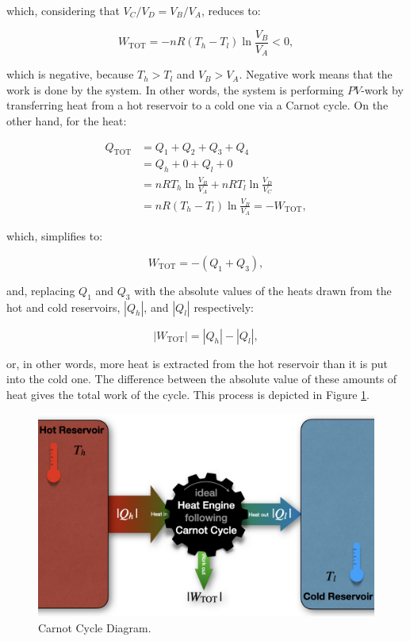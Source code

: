\documentclass[
  9pt,
]{extbook}
\theoremstyle{definition}
\theoremstyle{definition}
\theoremstyle{definition}
\theoremstyle{remark}
\begin{document}
which, considering that \(V_C/V_D=V_B/V_A\), reduces to:

\begin{equation}
  W_{\text{TOT}} = - nR \left( T_h-T_l \right) \ln \frac{V_B}{V_A} < 0,
  \label{eq:WtotCC2}
\end{equation}

which is negative, because \(T_h>T_l\) and \(V_B>V_A\). Negative work means that the work is done by the system. In other words, the system is performing \(PV\)-work by transferring heat from a hot reservoir to a cold one via a Carnot cycle. On the other hand, for the heat:

\begin{equation}
\begin{aligned}
  Q_{\text{TOT}} & = Q_1+Q_2+Q_3+Q_4 \\
                 & = Q_h + 0 + Q_l + 0    \\
                 & = nRT_h \ln \frac{V_B}{V_A} + nRT_l \ln \frac{V_D}{V_C} \\
                 & = nR \left( T_h-T_l \right) \ln \frac{V_B}{V_A} = -W_{\text{TOT}},
\end{aligned}
  \label{eq:QtotCC}
\end{equation}

which, simplifies to:

\begin{equation}
W_{\text{TOT}}=-(Q_1+Q_3),
  \label{eq:WtotCC3}
\end{equation}

and, replacing \(Q_1\) and \(Q_3\) with the absolute values of the heats drawn from the hot and cold reservoirs, \(\left| Q_h \right|\), and \(\left| Q_l \right|\) respectively:

\begin{equation}
\left| W_{\text{TOT}} \right| = \left| Q_h \right| - \left| Q_l \right|,
  \label{eq:QtotCC2}
\end{equation}

or, in other words, more heat is extracted from the hot reservoir than it is put into the cold one. The difference between the absolute value of these amounts of heat gives the total work of the cycle. This process is depicted in Figure \ref{fig:FigCarnotEff}.

\begin{figure}

{\centering \includegraphics[width=0.8\linewidth]{./img/OEP_Figures.009} 

}

\caption{Carnot Cycle Diagram.}\label{fig:FigCarnotEff}
\end{figure}
\end{document}
